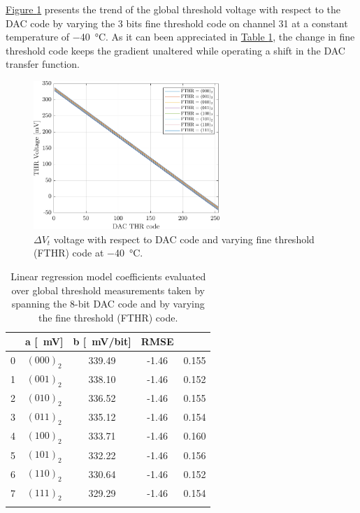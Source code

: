 \par
\hyperref[figDACfinethrtemp]{Figure \ref{figDACfinethrtemp}} presents the trend of the global threshold voltage with respect to the DAC code by varying the 3 bits fine threshold code on channel 31 at a constant temperature of \SI{-40}{\celsius}. As it can been appreciated in \hyperref[tabDAClinearmodel3]{Table \ref{tabDAClinearmodel3}}, the change in fine threshold code keeps the gradient unaltered while operating a shift in the DAC transfer function.

\begin{figure}[h!]
    \centering
    \includegraphics[width=0.63\textwidth]{Images/chap1/results/DAC_thr/DAC_thr_voltage_FTHR_-40C.pdf}
    \caption{$\Delta V_{\textit{t}}$ voltage with respect to DAC code and varying fine threshold (FTHR) code at \SI{-40}{\celsius}.}
    \label{figDACfinethrtemp}
\end{figure}

\begin{table}[h!]
    \centering
    \begin{tabular}{c c c c c} 
        \Xhline{2\arrayrulewidth}
        \multicolumn{2}{c}{FTHR} & a [\SI{}{\milli\volt}] & b [\SI{}{\milli\volt/bit}] & RMSE \T\B \\
        \hline
        0 & $(000)_{2}$ & 339.49 & -1.46 & 0.155 \T\B \\
        1 & $(001)_{2}$ & 338.10 & -1.46 & 0.152 \T\B \\
        2 & $(010)_{2}$ & 336.52 & -1.46 & 0.155 \T\B \\
        3 & $(011)_{2}$ & 335.12 & -1.46 & 0.154 \T\B \\
        4 & $(100)_{2}$ & 333.71 & -1.46 & 0.160 \T\B \\
        5 & $(101)_{2}$ & 332.22 & -1.46 & 0.156 \T\B \\
        6 & $(110)_{2}$ & 330.64 & -1.46 & 0.152 \T\B \\
        7 & $(111)_{2}$ & 329.29 & -1.46 & 0.154 \T\B \\
        \Xhline{2\arrayrulewidth}
    \end{tabular}
    \caption{Linear regression model coefficients evaluated over global threshold measurements taken by spanning the 8-bit DAC code and by varying the fine threshold (FTHR) code.}
    \label{tabDAClinearmodel3}
\end{table}


